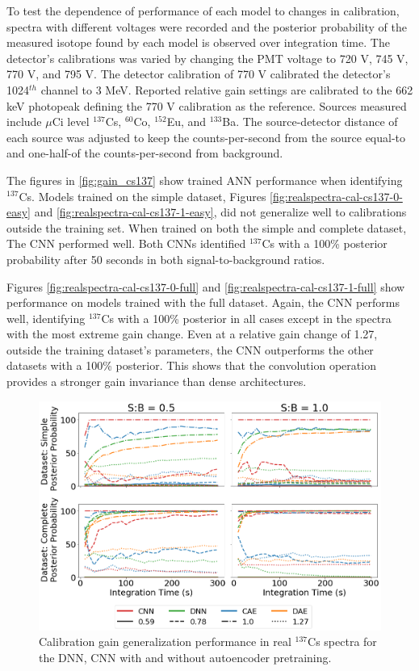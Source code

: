 To test the dependence of performance of each model to changes in calibration, spectra with different voltages were recorded and the posterior probability of the measured isotope found by each model is observed over integration time. The detector's calibrations was varied by changing the PMT voltage to 720 V, 745 V, 770 V, and 795 V. The detector calibration of 770 V calibrated the detector's 1024$^{th}$ channel to 3 MeV. Reported relative gain settings are calibrated to the 662 keV photopeak defining the 770 V calibration as the reference. Sources measured include $\mu$Ci level $^{137}$Cs, $^{60}$Co, $^{152}$Eu, and $^{133}$Ba. The source-detector distance of each source was adjusted to keep the counts-per-second from the source equal-to and one-half-of the counts-per-second from background.

The figures in \ref{fig:gain_cs137} show trained ANN performance when identifying $^{137}$Cs. Models trained on the simple dataset, Figures \ref{fig:realspectra-cal-cs137-0-easy} and \ref{fig:realspectra-cal-cs137-1-easy}, did not generalize well to calibrations outside the training set. When trained on both the simple and complete dataset, The CNN performed well. Both CNNs identified $^{137}$Cs with a 100\% posterior probability after 50 seconds in both signal-to-background ratios.%

Figures \ref{fig:realspectra-cal-cs137-0-full} and \ref{fig:realspectra-cal-cs137-1-full} show performance on models trained with the full dataset. Again, the CNN performs well, identifying $^{137}$Cs with a 100\% posterior in all cases except in the spectra with the most extreme gain change. Even at a relative gain change of 1.27, outside the training dataset's parameters, the CNN outperforms the other datasets with a 100\% posterior. This shows that the convolution operation provides a stronger gain invariance than dense architectures. 

\begin{figure}[H]
	\centering
	\includegraphics[width=1.0\linewidth]{images/realspectra-cal-cs137}
	\caption{Calibration gain generalization performance in real $^{137}$Cs spectra for the DNN, CNN with and without autoencoder pretraining.}
	\label{fig:realspectra-cal-cs137}
\end{figure}


